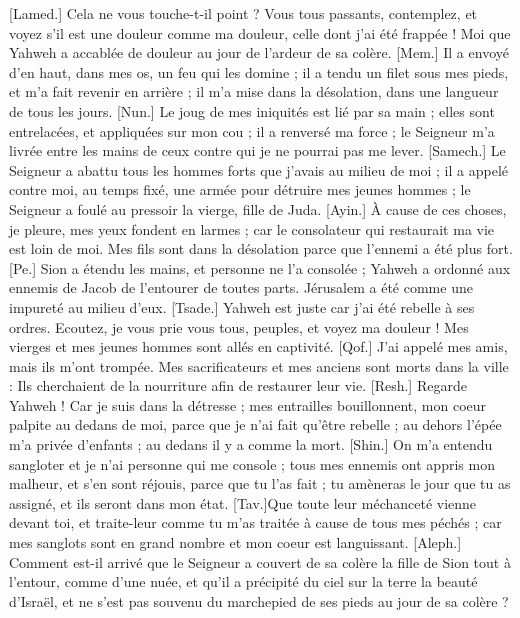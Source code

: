 \begin{multicols}{2}
[Lamed.] Cela ne vous touche-t-il point ? Vous tous passants, contemplez, et voyez s'il est une douleur comme ma douleur, celle dont j'ai été frappée ! Moi que Yahweh a accablée de douleur au jour de l'ardeur de sa colère.
[Mem.] Il a envoyé d'en haut, dans mes os, un feu qui les domine ; il a tendu un filet sous mes pieds, et m'a fait revenir en arrière ; il m'a mise dans la désolation, dans une langueur de tous les jours.
[Nun.] Le joug de mes iniquités est lié par sa main ; elles sont entrelacées, et appliquées sur mon cou ; il a renversé ma force ; le Seigneur m'a livrée entre les mains de ceux contre qui je ne pourrai pas me lever.
[Samech.] Le Seigneur a abattu tous les hommes forts que j'avais au milieu de moi ; il a appelé contre moi, au temps fixé, une armée pour détruire mes jeunes hommes ; le Seigneur a foulé au pressoir la vierge, fille de Juda.
[Ayin.] À cause de ces choses, je pleure, mes yeux fondent en larmes ; car le consolateur qui restaurait ma vie est loin de moi. Mes fils sont dans la désolation parce que l'ennemi a été plus fort.
[Pe.] Sion a étendu les mains, et personne ne l'a consolée ; Yahweh a ordonné aux ennemis de Jacob de l'entourer de toutes parts. Jérusalem a été comme une impureté au milieu d'eux.
[Tsade.] Yahweh est juste car j'ai été rebelle à ses ordres. Ecoutez, je vous prie vous tous, peuples, et voyez ma douleur ! Mes vierges et mes jeunes hommes sont allés en captivité.
[Qof.] J'ai appelé mes amis, mais ils m'ont trompée. Mes sacrificateurs et mes anciens sont morts dans la ville : Ils cherchaient de la nourriture afin de restaurer leur vie.
[Resh.] Regarde Yahweh ! Car je suis dans la détresse ; mes entrailles bouillonnent, mon coeur palpite au dedans de moi, parce que je n'ai fait qu'être rebelle ; au dehors l’épée m’a privée d’enfants ; au dedans il y a comme la mort. 
[Shin.] On m'a entendu sangloter et je n'ai personne qui me console ; tous mes ennemis ont appris mon malheur, et s’en sont réjouis, parce que tu l’as fait ; tu amèneras le jour que tu as assigné, et ils seront dans mon état.
[Tav.]Que toute leur méchanceté vienne devant toi, et traite-leur comme tu m'as traitée à cause de tous mes péchés ; car mes sanglots sont en grand nombre et mon coeur est languissant. 
\VerseOne{}[Aleph.] Comment est-il arrivé que le Seigneur a couvert de sa colère la fille de Sion tout à l'entour, comme d'une nuée, et qu'il a précipité du ciel sur la terre la beauté d'Israël, et ne s'est pas souvenu du marchepied de ses pieds au jour de sa colère ?

\end{multicols}

